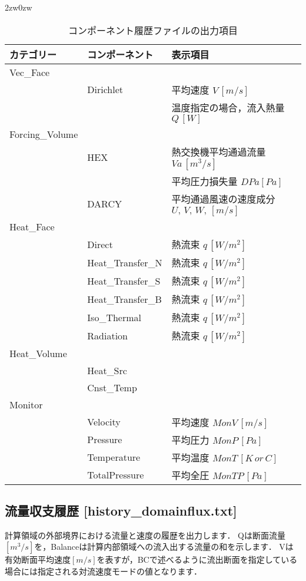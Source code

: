 \begin{indentation}{2zw}{0zw}
\begin{table}[htdp]
\caption{コンポーネント履歴ファイルの出力項目}
\begin{center}
\small
\begin{tabular}{lll} \toprule
カテゴリー & コンポーネント & 表示項目\\ \midrule
Vec\_Face & &\\
& Dirichlet & 平均速度 $V\,[m/s]$\\
& & 温度指定の場合，流入熱量 $Q\,[W]$\\
Forcing\_Volume & &\\
& HEX & 熱交換機平均通過流量 $Va\,[m^3/s]$\\
& & 平均圧力損失量 $DPa [Pa]$\\
& DARCY & 平均通過風速の速度成分 $U,\,V,\,W,\,[m/s]$\\
Heat\_Face & &\\
& Direct & 熱流束 $q\,[W/m^2]$\\
& Heat\_Transfer\_N & 熱流束 $q\,[W/m^2]$\\
& Heat\_Transfer\_S & 熱流束 $q\,[W/m^2]$\\
& Heat\_Transfer\_B & 熱流束 $q\,[W/m^2]$\\
& Iso\_Thermal & 熱流束 $q\,[W/m^2]$\\
& Radiation & 熱流束 $q\,[W/m^2]$\\
Heat\_Volume & &\\
& Heat\_Src &\\
& Cnst\_Temp &\\
Monitor & &\\
& Velocity & 平均速度 $MonV\,[m/s]$\\
& Pressure & 平均圧力 $MonP\,[Pa]$\\
& Temperature & 平均温度 $MonT\,[K\,or\,C]$\\
& TotalPressure & 平均全圧 $MonTP\,[Pa]$\\
\bottomrule
\end{tabular}
\end{center}
\label{tbl:monitor-display}
\end{table}

\end{indentation}



%
\pagebreak
\subsection{流量収支履歴 [history\_domainflux.txt]}
計算領域の外部境界における流量と速度の履歴を出力します．
Qは断面流量$[m^3/s]$を，Balanceは計算内部領域への流入出する流量の和を示します．
Vは有効断面平均速度$[m/s]$を表すが，BCで述べるように流出断面を指定している場合には指定される対流速度モードの値となります．

